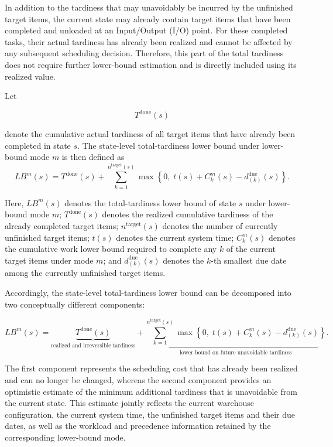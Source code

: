 In addition to the tardiness that may unavoidably be incurred by the unfinished
target items, the current state may already contain target items that have been
completed and unloaded at an Input/Output (I/O) point. For these completed
tasks, their actual tardiness has already been realized and cannot be affected
by any subsequent scheduling decision. Therefore, this part of the total
tardiness does not require further lower-bound estimation and is directly
included using its realized value.

Let

\[
T^{\mathrm{done}}(s)
\]

denote the cumulative actual tardiness of all target items that have already
been completed in state \(s\). The state-level total-tardiness lower bound under
lower-bound mode \(m\) is then defined as
\begin{equation}
LB^m(s)
=
T^{\mathrm{done}}(s)
+
\sum_{k=1}^{n^{\mathrm{target}}(s)}
\max
\left\{
0,\;
t(s)
+
C_k^m(s)
-
d_{(k)}^{\mathrm{due}}(s)
\right\}.
\end{equation}

Here, \(LB^m(s)\) denotes the total-tardiness lower bound of state \(s\) under
lower-bound mode \(m\);
\(T^{\mathrm{done}}(s)\) denotes the realized cumulative tardiness of the
already completed target items;
\(n^{\mathrm{target}}(s)\) denotes the number of currently unfinished target
items;
\(t(s)\) denotes the current system time;
\(C_k^m(s)\) denotes the cumulative work lower bound required to complete any
\(k\) of the current target items under mode \(m\); and
\(d_{(k)}^{\mathrm{due}}(s)\) denotes the \(k\)-th smallest due date among the
currently unfinished target items.

Accordingly, the state-level total-tardiness lower bound can be decomposed into
two conceptually different components:

\[
LB^m(s)
=
\underbrace{
T^{\mathrm{done}}(s)
}_{\text{realized and irreversible tardiness}}
+
\underbrace{
\sum_{k=1}^{n^{\mathrm{target}}(s)}
\max
\left\{
0,\;
t(s)
+
C_k^m(s)
-
d_{(k)}^{\mathrm{due}}(s)
\right\}
}_{\text{lower bound on future unavoidable tardiness}}.
\]

The first component represents the scheduling cost that has already been
realized and can no longer be changed, whereas the second component provides an
optimistic estimate of the minimum additional tardiness that is unavoidable
from the current state. This estimate jointly reflects the current warehouse
configuration, the current system time, the unfinished target items and their
due dates, as well as the workload and precedence information retained by the
corresponding lower-bound mode.


